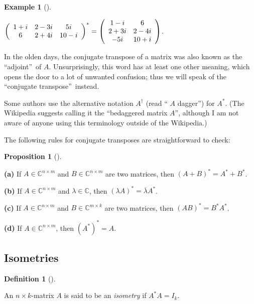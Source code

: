 \documentclass[numbers=enddot,12pt,final,onecolumn,notitlepage]{scrartcl}%
\numberwithin{exer}{subsection}
\theoremstyle{definition}
\newtheorem{prop}[theo]{Proposition}
\newenvironment{proposition}[1][]
{\begin{prop}[#1]\begin{leftbar}}
{\end{leftbar}\end{prop}}
\newtheorem{defi}[theo]{Definition}
\newenvironment{definition}[1][]
{\begin{defi}[#1]\begin{leftbar}}
{\end{leftbar}\end{defi}}
\newtheorem{exam}[theo]{Example}
\newenvironment{example}[1][]
{\begin{exam}[#1]\begin{leftbar}}
{\end{leftbar}\end{exam}}
\begin{document}
\begin{example}
$\left(
\begin{array}
[c]{ccc}%
1+i & 2-3i & 5i\\
6 & 2+4i & 10-i
\end{array}
\right)  ^{\ast}=\left(
\begin{array}
[c]{cc}%
1-i & 6\\
2+3i & 2-4i\\
-5i & 10+i
\end{array}
\right)  $.
\end{example}

In the olden days, the conjugate transpose of a matrix was also known as the
\textquotedblleft adjoint\textquotedblright\ of $A$. Unsurprisingly, this word
has at least one other meaning, which opens the door to a lot of unwanted
confusion; thus we will speak of the \textquotedblleft conjugate
transpose\textquotedblright\ instead.

Some authors use the alternative notation $A^{\dag}$ (read \textquotedblleft%
$A$ dagger\textquotedblright) for $A^{\ast}$. (The Wikipedia suggests calling
it the \textquotedblleft bedaggered matrix $A$\textquotedblright, although I
am not aware of anyone using this terminology outside of the Wikipedia.)
\medskip

The following rules for conjugate transposes are straightforward to check:

\begin{proposition}
\label{prop.unitary.(AB)*}\textbf{(a)} If $A\in\mathbb{C}^{n\times m}$ and
$B\in\mathbb{C}^{n\times m}$ are two matrices, then $\left(  A+B\right)
^{\ast}=A^{\ast}+B^{\ast}$. \medskip

\textbf{(b)} If $A\in\mathbb{C}^{n\times m}$ and $\lambda\in\mathbb{C}$, then
$\left(  \lambda A\right)  ^{\ast}=\overline{\lambda}A^{\ast}$. \medskip

\textbf{(c)} If $A\in\mathbb{C}^{n\times m}$ and $B\in\mathbb{C}^{m\times k}$
are two matrices, then $\left(  AB\right)  ^{\ast}=B^{\ast}A^{\ast}$. \medskip

\textbf{(d)} If $A\in\mathbb{C}^{n\times m}$, then $\left(  A^{\ast}\right)
^{\ast}=A$.
\end{proposition}

\subsection{Isometries}

\begin{definition}
\label{def.unitary.innerprod.isometry}An $n\times k$-matrix $A$ is said to be
an \emph{isometry} if $A^{\ast}A=I_{k}$.
\end{definition}
\end{document}
